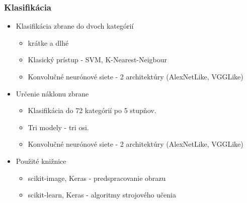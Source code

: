 \documentclass[10pt,xcolor=pdflatex]{beamer}
\begin{document}
\begin{frame}\frametitle{Klasifikácia}
    \begin{itemize}
        \item Klasifikácia zbrane do dvoch kategórií
        \begin{itemize}
            \item krátke a dlhé
            \vspace{0.2cm}
            \item Klasický prístup - SVM, K-Nearest-Neigbour
            \item Konvolučné neurónové siete - 2 architektúry (AlexNetLike, VGGLike)
        \end{itemize}

        \vspace{0.1cm}

        \item Určenie náklonu zbrane
        \begin{itemize}
            \item Klasifikácia do 72 kategórií po 5 stupňov.
            \item Tri modely - tri osi.
            \vspace{0.2cm}
            \item Konvolučné neurónové siete - 2 architektúry (AlexNetLike, VGGLike)
        \end{itemize}

        \vspace{0.3cm}

        \item Použité knižnice
        \begin{itemize}
            \item scikit-image, Keras - predspracovanie obrazu
            \item scikit-learn, Keras - algoritmy strojového učenia
        \end{itemize}

    \end{itemize}
\end{frame}

\end{document}
